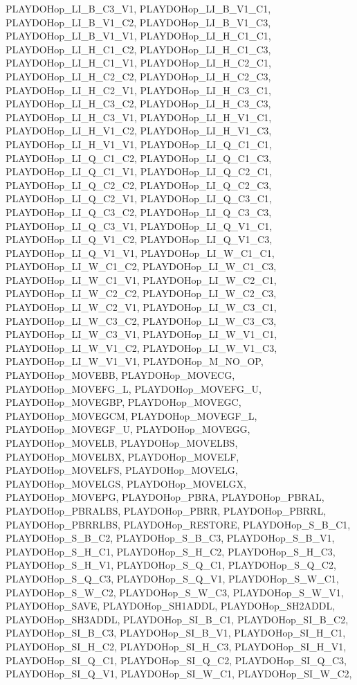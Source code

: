 PLAYDOHop\_\-LI\_\-B\_\-C3\_\-V1, PLAYDOHop\_\-LI\_\-B\_\-V1\_\-C1, PLAYDOHop\_\-LI\_\-B\_\-V1\_\-C2, PLAYDOHop\_\-LI\_\-B\_\-V1\_\-C3, PLAYDOHop\_\-LI\_\-B\_\-V1\_\-V1, PLAYDOHop\_\-LI\_\-H\_\-C1\_\-C1, PLAYDOHop\_\-LI\_\-H\_\-C1\_\-C2, PLAYDOHop\_\-LI\_\-H\_\-C1\_\-C3, PLAYDOHop\_\-LI\_\-H\_\-C1\_\-V1, PLAYDOHop\_\-LI\_\-H\_\-C2\_\-C1, PLAYDOHop\_\-LI\_\-H\_\-C2\_\-C2, PLAYDOHop\_\-LI\_\-H\_\-C2\_\-C3, PLAYDOHop\_\-LI\_\-H\_\-C2\_\-V1, PLAYDOHop\_\-LI\_\-H\_\-C3\_\-C1, PLAYDOHop\_\-LI\_\-H\_\-C3\_\-C2, PLAYDOHop\_\-LI\_\-H\_\-C3\_\-C3, PLAYDOHop\_\-LI\_\-H\_\-C3\_\-V1, PLAYDOHop\_\-LI\_\-H\_\-V1\_\-C1, PLAYDOHop\_\-LI\_\-H\_\-V1\_\-C2, PLAYDOHop\_\-LI\_\-H\_\-V1\_\-C3, PLAYDOHop\_\-LI\_\-H\_\-V1\_\-V1, PLAYDOHop\_\-LI\_\-Q\_\-C1\_\-C1, PLAYDOHop\_\-LI\_\-Q\_\-C1\_\-C2, PLAYDOHop\_\-LI\_\-Q\_\-C1\_\-C3, PLAYDOHop\_\-LI\_\-Q\_\-C1\_\-V1, PLAYDOHop\_\-LI\_\-Q\_\-C2\_\-C1, PLAYDOHop\_\-LI\_\-Q\_\-C2\_\-C2, PLAYDOHop\_\-LI\_\-Q\_\-C2\_\-C3, PLAYDOHop\_\-LI\_\-Q\_\-C2\_\-V1, PLAYDOHop\_\-LI\_\-Q\_\-C3\_\-C1, PLAYDOHop\_\-LI\_\-Q\_\-C3\_\-C2, PLAYDOHop\_\-LI\_\-Q\_\-C3\_\-C3, PLAYDOHop\_\-LI\_\-Q\_\-C3\_\-V1, PLAYDOHop\_\-LI\_\-Q\_\-V1\_\-C1, PLAYDOHop\_\-LI\_\-Q\_\-V1\_\-C2, PLAYDOHop\_\-LI\_\-Q\_\-V1\_\-C3, PLAYDOHop\_\-LI\_\-Q\_\-V1\_\-V1, PLAYDOHop\_\-LI\_\-W\_\-C1\_\-C1, PLAYDOHop\_\-LI\_\-W\_\-C1\_\-C2, PLAYDOHop\_\-LI\_\-W\_\-C1\_\-C3, PLAYDOHop\_\-LI\_\-W\_\-C1\_\-V1, PLAYDOHop\_\-LI\_\-W\_\-C2\_\-C1, PLAYDOHop\_\-LI\_\-W\_\-C2\_\-C2, PLAYDOHop\_\-LI\_\-W\_\-C2\_\-C3, PLAYDOHop\_\-LI\_\-W\_\-C2\_\-V1, PLAYDOHop\_\-LI\_\-W\_\-C3\_\-C1, PLAYDOHop\_\-LI\_\-W\_\-C3\_\-C2, PLAYDOHop\_\-LI\_\-W\_\-C3\_\-C3, PLAYDOHop\_\-LI\_\-W\_\-C3\_\-V1, PLAYDOHop\_\-LI\_\-W\_\-V1\_\-C1, PLAYDOHop\_\-LI\_\-W\_\-V1\_\-C2, PLAYDOHop\_\-LI\_\-W\_\-V1\_\-C3, PLAYDOHop\_\-LI\_\-W\_\-V1\_\-V1, PLAYDOHop\_\-M\_\-NO\_\-OP, PLAYDOHop\_\-MOVEBB, PLAYDOHop\_\-MOVECG, PLAYDOHop\_\-MOVEFG\_\-L, PLAYDOHop\_\-MOVEFG\_\-U, PLAYDOHop\_\-MOVEGBP, PLAYDOHop\_\-MOVEGC, PLAYDOHop\_\-MOVEGCM, PLAYDOHop\_\-MOVEGF\_\-L, PLAYDOHop\_\-MOVEGF\_\-U, PLAYDOHop\_\-MOVEGG, PLAYDOHop\_\-MOVELB, PLAYDOHop\_\-MOVELBS, PLAYDOHop\_\-MOVELBX, PLAYDOHop\_\-MOVELF, PLAYDOHop\_\-MOVELFS, PLAYDOHop\_\-MOVELG, PLAYDOHop\_\-MOVELGS, PLAYDOHop\_\-MOVELGX, PLAYDOHop\_\-MOVEPG, PLAYDOHop\_\-PBRA, PLAYDOHop\_\-PBRAL, PLAYDOHop\_\-PBRALBS, PLAYDOHop\_\-PBRR, PLAYDOHop\_\-PBRRL, PLAYDOHop\_\-PBRRLBS, PLAYDOHop\_\-RESTORE, PLAYDOHop\_\-S\_\-B\_\-C1, PLAYDOHop\_\-S\_\-B\_\-C2, PLAYDOHop\_\-S\_\-B\_\-C3, PLAYDOHop\_\-S\_\-B\_\-V1, PLAYDOHop\_\-S\_\-H\_\-C1, PLAYDOHop\_\-S\_\-H\_\-C2, PLAYDOHop\_\-S\_\-H\_\-C3, PLAYDOHop\_\-S\_\-H\_\-V1, PLAYDOHop\_\-S\_\-Q\_\-C1, PLAYDOHop\_\-S\_\-Q\_\-C2, PLAYDOHop\_\-S\_\-Q\_\-C3, PLAYDOHop\_\-S\_\-Q\_\-V1, PLAYDOHop\_\-S\_\-W\_\-C1, PLAYDOHop\_\-S\_\-W\_\-C2, PLAYDOHop\_\-S\_\-W\_\-C3, PLAYDOHop\_\-S\_\-W\_\-V1, PLAYDOHop\_\-SAVE, PLAYDOHop\_\-SH1ADDL, PLAYDOHop\_\-SH2ADDL, PLAYDOHop\_\-SH3ADDL, PLAYDOHop\_\-SI\_\-B\_\-C1, PLAYDOHop\_\-SI\_\-B\_\-C2, PLAYDOHop\_\-SI\_\-B\_\-C3, PLAYDOHop\_\-SI\_\-B\_\-V1, PLAYDOHop\_\-SI\_\-H\_\-C1, PLAYDOHop\_\-SI\_\-H\_\-C2, PLAYDOHop\_\-SI\_\-H\_\-C3, PLAYDOHop\_\-SI\_\-H\_\-V1, PLAYDOHop\_\-SI\_\-Q\_\-C1, PLAYDOHop\_\-SI\_\-Q\_\-C2, PLAYDOHop\_\-SI\_\-Q\_\-C3, PLAYDOHop\_\-SI\_\-Q\_\-V1, PLAYDOHop\_\-SI\_\-W\_\-C1, PLAYDOHop\_\-SI\_\-W\_\-C2, 
